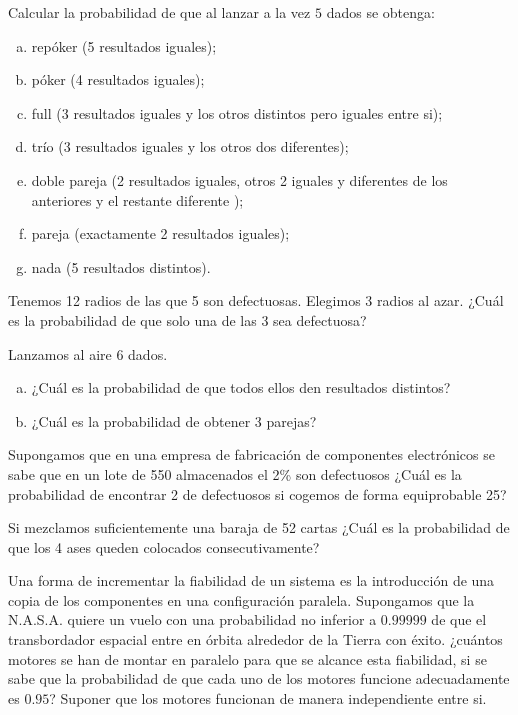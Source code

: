 \documentclass[12pt]{article}
\begin{document}
\probl  Calcular la probabilidad de que al lanzar a la vez $5$
dados se obtenga:
\begin{enumerate}[a)]
\item repóker (5 resultados iguales);
\item póker (4 resultados iguales);
\item full (3 resultados iguales y los otros distintos pero iguales entre si);
\item trío (3  resultados iguales y los otros dos  diferentes);
\item doble pareja (2 resultados  iguales, otros 2 iguales y diferentes de los anteriores y el restante diferente
);
\item pareja (exactamente 2 resultados iguales);
\item nada (5 resultados distintos).
\end{enumerate}

\probl  Tenemos 12 radios de las   que  5 son defectuosas. Elegimos  3 radios al azar.
¿Cuál  es la probabilidad de que solo una de las 3 sea defectuosa? 

\probl  Lanzamos al aire 6 dados.
\begin{enumerate}[a)]
\item ¿Cuál es la probabilidad de que todos ellos den resultados distintos?
\item ¿Cuál es la probabilidad de obtener 3 parejas?
\end{enumerate}

\probl  Supongamos que en una empresa de fabricación de componentes electrónicos se sabe
que en un lote de 550 almacenados el 2\% son   defectuosos ¿Cuál es la probabilidad de
encontrar 2 de defectuosos si cogemos de forma equiprobable 25? 

\probl  Si mezclamos   suficientemente una baraja de 52 cartas ¿Cuál es la probabilidad
de que los 4 ases queden colocados consecutivamente? 

\probl  Una forma de incrementar la  fiabilidad de un sistema es la introducción de una
copia de los componentes en una configuración paralela. Supongamos  que la N.A.S.A.
quiere un vuelo  con una probabilidad no inferior a $0.99999$ de  que el transbordador
espacial entre en órbita alrededor de la Tierra con éxito. ¿cuántos   motores se han de
montar en  paralelo para que se  alcance esta fiabilidad, si se sabe que la probabilidad
de que cada uno de los motores funcione adecuadamente es $0.95$? Suponer que los motores
funcionan de manera independiente entre si. 
\end{document}
